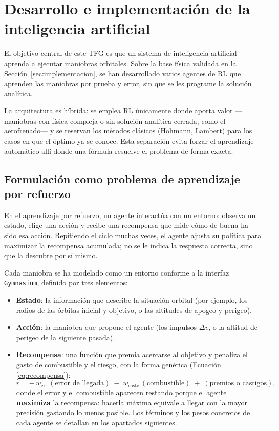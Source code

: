 \section{Desarrollo e implementación de la inteligencia artificial}
\label{sec:ia}

El objetivo central de este \gls{TFG} es que un sistema de inteligencia artificial aprenda a ejecutar maniobras orbitales. Sobre la base física validada en la Sección~\ref{sec:implementacion}, se han desarrollado varios agentes de \gls{RL} que aprenden las maniobras por prueba y error, sin que se les programe la solución analítica.

La arquitectura es híbrida: se emplea \gls{RL} únicamente donde aporta valor ---maniobras con física compleja o sin solución analítica cerrada, como el aerofrenado--- y se reservan los métodos clásicos (Hohmann, Lambert) para los casos en que el óptimo ya se conoce. Esta separación evita forzar el aprendizaje automático allí donde una fórmula resuelve el problema de forma exacta.

\subsection{Formulación como problema de aprendizaje por refuerzo}
\label{sec:ia-formulacion}

En el aprendizaje por refuerzo, un agente interactúa con un entorno:
observa un estado, elige una acción y recibe una recompensa que mide cómo de buena ha sido esa acción. Repitiendo el ciclo muchas veces, el agente ajusta su política para maximizar la recompensa acumulada; no se le indica la respuesta correcta, sino que la descubre por sí mismo.

Cada maniobra se ha modelado como un entorno conforme a la interfaz \texttt{Gymnasium}, definido por tres elementos:
\begin{itemize}
  \item \textbf{Estado}: la información que describe la situación orbital (por ejemplo, los radios de las órbitas inicial y objetivo, o las altitudes de apogeo y perigeo).
  \item \textbf{Acción}: la maniobra que propone el agente (los impulsos $\Delta v$, o la altitud de perigeo de la siguiente pasada).
  \item \textbf{Recompensa}: una función que premia acercarse al objetivo y penaliza el gasto de combustible y el riesgo, con la forma genérica (Ecuación \ref{eq:recompensa}):
        \begin{equation}
          r = -\,w_{\text{err}}\,(\text{error de llegada})
              \;-\; w_{\text{coste}}\,(\text{combustible})
              \;+\; (\text{premios o castigos}),
          \label{eq:recompensa}
        \end{equation}
        donde el error y el combustible aparecen restando porque el agente
        \textbf{maximiza} la recompensa: hacerla máxima equivale a llegar con la mayor precisión gastando lo menos posible. Los términos y los pesos concretos de cada agente se detallan en los apartados siguientes.
\end{itemize}

